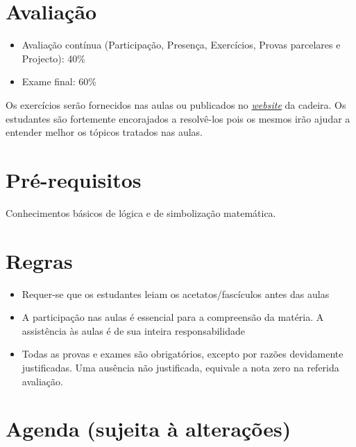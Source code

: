 \section*{Avaliação}%
\begin{itemize}
  \item Avaliação contínua (Participação, Presença, Exercícios, Provas
  parcelares e Projecto): 40\%
  \item Exame final: 60\%
\end{itemize}

Os exercícios serão fornecidos nas aulas ou publicados no
\href{www.dizando.me/ed2017}{\emph{website}} da cadeira. Os estudantes são
fortemente encorajados a resolvê-los pois os mesmos irão ajudar a entender
melhor os tópicos tratados nas aulas.
%
\section*{Pré-requisitos}

Conhecimentos básicos de lógica e de simbolização matemática.

\section*{Regras}

\begin{itemize}
  \item {Requer-se que os estudantes leiam os acetatos/fascículos antes das
  aulas}
  \item {A participação nas aulas é essencial para a compreensão da matéria. A assistência às aulas é de sua inteira
  responsabilidade}
  \item {Todas as provas e exames são obrigatórios, excepto por razões devidamente justificadas. Uma ausência não justificada, 
  equivale a nota zero na referida avaliação.}
\end{itemize}

\section*{Agenda (sujeita à alterações)}

